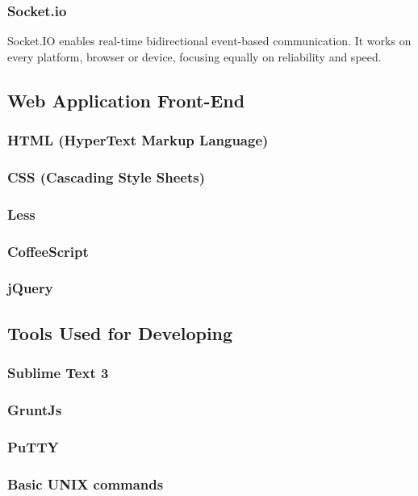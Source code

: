 \subsubsection{Socket.io}
Socket.IO enables real-time bidirectional event-based communication.
It works on every platform, browser or device, focusing equally on reliability and speed.
\subsection{Web Application Front-End} 
\subsubsection{HTML (HyperText Markup Language)}
\subsubsection{CSS (Cascading Style Sheets)}
\subsubsection{Less}
\subsubsection{CoffeeScript}
\subsubsection{jQuery}
\subsection{Tools Used for Developing}
\subsubsection{Sublime Text 3}
\subsubsection{GruntJs}
\subsubsection{PuTTY}
\subsubsection{Basic UNIX commands }

